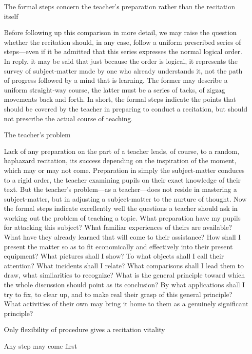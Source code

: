 \documentclass[letterpaper]{book}
\begin{document}
The formal steps concern the teacher's preparation rather than the
recitation itself

Before following up this comparison in more detail, we may raise the
question whether the recitation should, in any case, follow a uniform
prescribed series of steps---even if it be admitted that this series
expresses the normal logical order. In reply, it may be said that just
because the order is logical, it represents the survey of subject-matter
made by one who already understands it, not the path of progress
followed by a mind that is learning. The former may describe a uniform
straight-way course, the latter must be a series of tacks, of zigzag
movements back and forth. In short, the formal steps indicate the points
that should be covered by the teacher in preparing to conduct a
recitation, but should not prescribe the actual course of teaching.

The teacher's problem

Lack of any preparation on the part of a teacher leads, of course, to a
random, haphazard recitation, its success depending on the inspiration
of the moment, which may or may not come. Preparation in simply the
subject-matter conduces to a rigid order, the teacher examining pupils
on their exact knowledge of their text. But the teacher's problem---as a
teacher---does not reside in mastering a subject-matter, but in
adjusting a subject-matter to the nurture of thought. Now
the
formal steps indicate excellently well the questions a teacher should
ask in working out the problem of teaching a topic. What preparation
have my pupils for attacking this subject? What familiar experiences of
theirs are available? What have they already learned that will come to
their assistance? How shall I present the matter so as to fit
economically and effectively into their present equipment? What pictures
shall I show? To what objects shall I call their attention? What
incidents shall I relate? What comparisons shall I lead them to draw,
what similarities to recognize? What is the general principle toward
which the whole discussion should point as its conclusion? By what
applications shall I try to fix, to clear up, and to make real their
grasp of this general principle? What activities of their own may bring
it home to them as a genuinely significant principle?

Only flexibility of procedure gives a recitation vitality

Any step may come first
\end{document}
